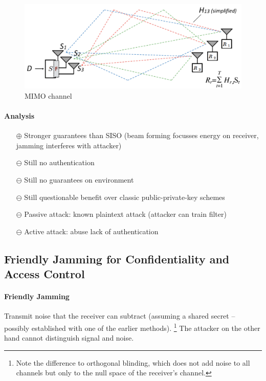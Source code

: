 \begin{figure}
	\centering
	\includegraphics[scale=0.3]{images/7-mimo.png}
	\caption{MIMO channel}
	\label{fig:mimo}
\end{figure}

\paragraph{Analysis}
\begin{itemize}
	\item[$\oplus$] Stronger guarantees than SISO (beam forming focusses energy on receiver, jamming interferes with attacker)
	\item[$\ominus$] Still no authentication
	\item[$\ominus$] Still no guarantees on environment
	\item[$\ominus$] Still questionable benefit over classic public-private-key
	 schemes
	\item[$\ominus$] Passive attack: known plaintext attack (attacker can train filter)
	\item[$\ominus$] Active attack: abuse lack of authentication
\end{itemize}


\subsection{Friendly Jamming for Confidentiality and Access Control}

\paragraph{Friendly Jamming}
Transmit noise that the receiver can subtract (assuming a shared secret -- possibly established with one of the earlier methods).%
\footnote{Note the difference to orthogonal blinding, which does not add noise to all channels but only to the null space of the receiver's channel.}
The attacker on the other hand cannot distinguish signal and noise.

